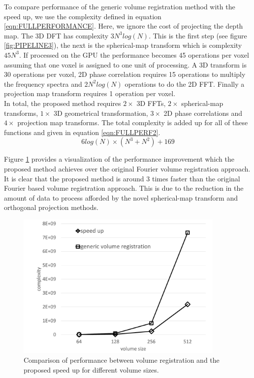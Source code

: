 To compare performance of the generic volume registration method with the speed up, we use the complexity defined in equation \ref{eqn:FULLPERFORMANCE}. Here, we ignore the cost of projecting the depth map. The 3D DFT has complexity $3N^3log(N)$. This is the first step (see figure \ref{fig:PIPELINE3}), the next is the spherical-map transform which is complexity $45N^3$. If processed on the GPU the performance becomes 45 operations per voxel assuming that one voxel is assigned to one unit of processing. A 3D transform is 30 operations per voxel, 2D phase correlation requires 15 operations to multiply the frequency spectra and $2N^2log(N)$ operations to do the 2D FFT. Finally a projection map transform requires 1 operation per voxel. \\

In total, the proposed method requires $2 \times$ 3D FFTs, $2 \times$ spherical-map transforms, $1 \times$ 3D geometrical transformation, $3 \times$ 2D phase correlations and $4 \times$ projection map transforms. The total complexity is added up for all of these functions and given in equation \ref{eqn:FULLPERF2}. \\

\begin{equation} \label{eqn:FULLPERF2}
6log(N)\times (N^3 + N^2) + 169
\end{equation}

Figure \ref{fig:perfComp} provides a visualization of the performance improvement which the proposed method achieves over the original Fourier volume registration approach. It is clear that the proposed method is around 3 times faster
than the original Fourier based volume registration approach. This is due to the reduction in the amount of data to process afforded by the novel spherical-map transform and orthogonal projection methods.

\begin{figure}[!htb]
\centering
\includegraphics[width=4.0in]{images/ch2/perfcomp}
\caption{Comparison of performance between volume registration and the proposed speed up for different volume sizes.}
\label{fig:perfComp}
\end{figure}
